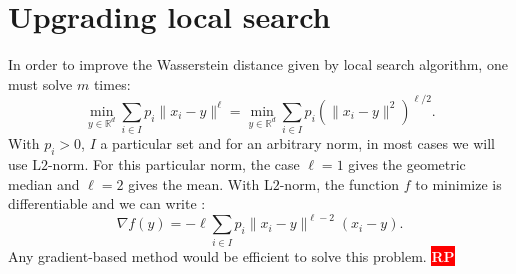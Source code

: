 \documentclass{amsart}
\newcommand{\nb}[3]{
		{\colorbox{#2}{\bfseries\sffamily\tiny\textcolor{white}{#1}}}
		{\textcolor{#2}{\text{$\blacktriangleright$}{\textcolor{#2}{#3}}\text{$\blacktriangleleft$}}}}
\newcommand{\rp}[1]{\nb{RP}{red}{#1}}
\newcommand{\RR}{\mathbb{R}}
\begin{document}
\section{Upgrading local search}\label{L_p optim}
In order to improve the Wasserstein distance given by local search algorithm, one must solve $m$ times: 
$$
\min_{y\in\RR^d}\sum_{i\in I}p_i\lVert x_i-y\rVert^\ell=\min_{y\in\RR^d}\sum_{i\in I}p_i\left(\lVert x_i-y\rVert^2\right)^{\ell/2}.
$$
With $p_i>0$, $I$ a particular set and for an arbitrary norm, in most cases we will use $\text{L}2$-norm. For this particular norm, the case $\ell=1$ gives the geometric median and $\ell=2$ gives the mean. With L$2$-norm, the function $f$ to minimize is differentiable and we can write : 
$$
\nabla f\left(y\right)=-\ell\sum_{i\in I}p_i\lVert x_i-y\rVert^{\ell-2}\left(x_i-y\right).
$$
Any gradient-based method would be efficient to solve this problem. \rp{can be interesting to study more but hard to find references}


\end{document}
